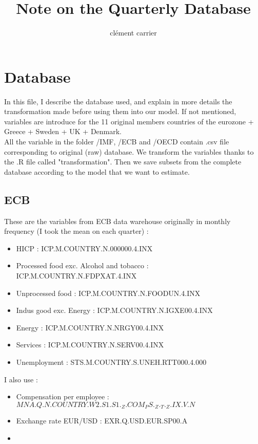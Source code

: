 \documentclass[11pt,a4paper]{article}
\title{Note on the Quarterly Database}
\author{clément carrier}
\begin{document}
\maketitle

\section{Database}

In this file, I describe the database used, and explain in more details the transformation made before using them into our model. If not mentioned, variables are introduce for the 11 original members countries of the eurozone + Greece + Sweden + UK + Denmark.\\

All the variable in the folder /IMF, /ECB and /OECD contain .csv file corresponding to original (raw) database. We transform the variables thanks to the .R file called "transformation". Then we save subsets from the complete database according to the model that we want to estimate. 




\subsection{ECB}

These are the variables from ECB data warehouse originally in monthly frequency (I took the mean on each quarter) : 
\begin{itemize}
\item HICP : ICP.M.COUNTRY.N.000000.4.INX
\item Processed food exc. Alcohol and tobacco : ICP.M.COUNTRY.N.FDPXAT.4.INX
\item Unprocessed food	: ICP.M.COUNTRY.N.FOODUN.4.INX
\item Indus good exc. Energy : ICP.M.COUNTRY.N.IGXE00.4.INX
\item Energy	:	ICP.M.COUNTRY.N.NRGY00.4.INX
\item Services	:	ICP.M.COUNTRY.N.SERV00.4.INX
\item Unemployment : STS.M.COUNTRY.S.UNEH.RTT000.4.000
\end{itemize}

\vspace{0.5cm}

I also use : 

\begin{itemize}
\item Compensation per employee : $MNA.Q.N.COUNTRY.W2.S1.S1._Z.COM_PS._Z._T._Z.IX.V.N$
\item Exchange rate EUR/USD : EXR.Q.USD.EUR.SP00.A
\item 
\end{itemize}
\end{document}
